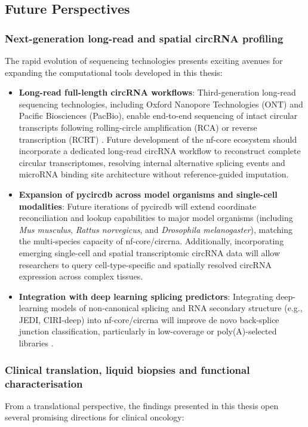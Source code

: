 \subsection{Future Perspectives}

\subsubsection{Next-generation long-read and spatial circRNA profiling}
The rapid evolution of sequencing technologies presents exciting avenues for expanding the computational tools developed in this thesis:

\begin{itemize}
    \item \textbf{Long-read full-length circRNA workflows}: Third-generation long-read sequencing technologies, including Oxford Nanopore Technologies (ONT) and Pacific Biosciences (PacBio), enable end-to-end sequencing of intact circular transcripts following rolling-circle amplification (RCA) or reverse transcription (RCRT) \cite{isoCirc, CIRIlong, circFLseq}. Future development of the nf-core ecosystem should incorporate a dedicated long-read circRNA workflow to reconstruct complete circular transcriptomes, resolving internal alternative splicing events and microRNA binding site architecture without reference-guided imputation.
    
    \item \textbf{Expansion of pycircdb across model organisms and single-cell modalities}: Future iterations of pycircdb will extend coordinate reconciliation and lookup capabilities to major model organisms (including \textit{Mus musculus}, \textit{Rattus norvegicus}, and \textit{Drosophila melanogaster}), matching the multi-species capacity of nf-core/circrna. Additionally, incorporating emerging single-cell and spatial transcriptomic circRNA data will allow researchers to query cell-type-specific and spatially resolved circRNA expression across complex tissues.

    \item \textbf{Integration with deep learning splicing predictors}: Integrating deep-learning models of non-canonical splicing and RNA secondary structure (e.g., JEDI, CIRI-deep) into nf-core/circrna will improve de novo back-splice junction classification, particularly in low-coverage or poly(A)-selected libraries \cite{JEDI, CIRIdeep}.
\end{itemize}

\subsubsection{Clinical translation, liquid biopsies and functional characterisation}
From a translational perspective, the findings presented in this thesis open several promising directions for clinical oncology:

